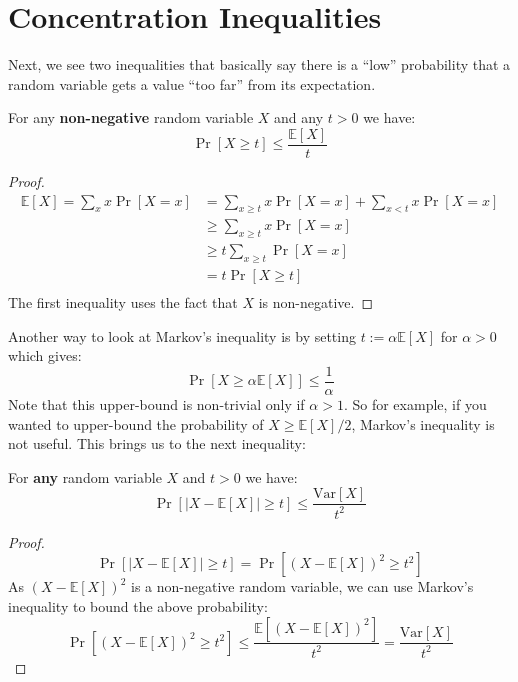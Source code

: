 \documentclass[11pt]{article}
\newcommand{\Ex}{\mathbb{E}}
\newcommand{\Var}{\text{Var}}
\begin{document}
\section{Concentration Inequalities}
Next, we see two inequalities that basically say there is a ``low'' probability that a random variable gets a value ``too far'' from its expectation.
\begin{theorem}
For any \textbf{non-negative} random variable $X$ and any $t > 0$ we have:
\begin{equation*}
    \Pr[X \geq t] \leq \frac{\Ex[X]}{t}
\end{equation*}
\end{theorem}
\begin{proof}
\begin{align*}
    \Ex[X] = \sum\limits_x x\Pr[X = x] &=  \sum\limits_{x \geq t} x\Pr[X = x] + \sum\limits_{x < t} x\Pr[X = x]\\
                                    &\geq \sum\limits_{x \geq t} x\Pr[X = x] \\
                                    &\geq t\sum\limits_{x \geq t} \Pr[X = x]\\
                                    &= t\Pr[X \geq t]\\
\end{align*}
The first inequality uses the fact that $X$ is non-negative.
\end{proof}
Another way to look at Markov's inequality is by setting $t := \alpha\Ex[X]$ for $\alpha > 0$ which gives:
\begin{equation*}
    \Pr[X \geq \alpha\Ex[X]] \leq \frac{1}{\alpha}
\end{equation*}
Note that this upper-bound is non-trivial only if $\alpha > 1$. So for example, if you wanted to upper-bound the probability of $X \geq \Ex[X]/2$, Markov's inequality is not useful. This brings us to the next inequality:
\begin{theorem}
For \textbf{any} random variable $X$ and $t>0$ we have:
\begin{equation*}
    \Pr[|X - \Ex[X]| \geq t] \leq \frac{\Var[X]}{t^2}
\end{equation*}
\end{theorem}
\begin{proof}

\begin{equation*}
    \Pr[|X - \Ex[X]| \geq t] = \Pr[(X - \Ex[X])^2 \geq t^2] 
\end{equation*}
As $(X - \Ex[X])^2$ is a non-negative random variable, we can use Markov's inequality to bound the above probability:
\begin{equation*}
    \Pr[(X - \Ex[X])^2 \geq t^2] \leq \frac{\Ex[(X - \Ex[X])^2]}{t^2} = \frac{\Var[X]}{t^2}
\end{equation*}
\end{proof}
\end{document}
